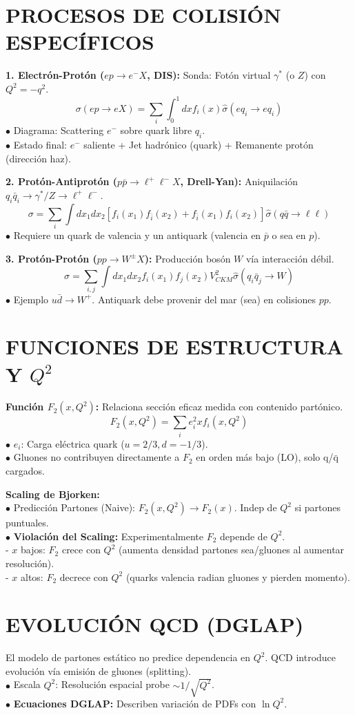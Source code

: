 \section{PROCESOS DE COLISIÓN ESPECÍFICOS}
\textbf{1. Electrón-Protón ($ep \to e^- X$, DIS):}
Sonda: Fotón virtual $\gamma^*$ (o $Z$) con $Q^2 = -q^2$.
$$ \sigma(ep \to eX) = \sum_i \int_0^1 dx f_i(x) \hat{\sigma}(eq_i \to eq_i) $$
$\bullet$ Diagrama: Scattering $e^-$ sobre quark libre $q_i$. \\
$\bullet$ Estado final: $e^-$ saliente + Jet hadrónico (quark) + Remanente protón (dirección haz).

\textbf{2. Protón-Antiprotón ($p\bar{p} \to \ell^+\ell^- X$, Drell-Yan):}
Aniquilación $q_i \bar{q}_i \to \gamma^*/Z \to \ell^+ \ell^-$.
$$ \sigma = \sum_{i} \int dx_1 dx_2 [f_i(x_1) f_{\bar{i}}(x_2) + f_{\bar{i}}(x_1) f_i(x_2)] \hat{\sigma}(q\bar{q} \to \ell\ell) $$
$\bullet$ Requiere un quark de valencia y un antiquark (valencia en $\bar{p}$ o sea en $p$).

\textbf{3. Protón-Protón ($pp \to W^\pm X$):}
Producción bosón $W$ vía interacción débil.
$$ \sigma = \sum_{i,j} \int dx_1 dx_2 f_i(x_1) f_j(x_2) V_{CKM}^2 \hat{\sigma}(q_i \bar{q}_j \to W) $$
$\bullet$ Ejemplo $u \bar{d} \to W^+$. Antiquark debe provenir del mar (sea) en colisiones $pp$.

\section{FUNCIONES DE ESTRUCTURA Y $Q^2$}
\textbf{Función $F_2(x, Q^2)$:}
Relaciona sección eficaz medida con contenido partónico.
$$ F_2(x, Q^2) = \sum_i e_i^2 x f_i(x, Q^2) $$
$\bullet$ $e_i$: Carga eléctrica quark ($u=2/3, d=-1/3$). \\
    $\bullet$ Gluones no contribuyen directamente a $F_2$ en orden más bajo (LO), solo q/$\bar{\text{q}}$ cargados.

\textbf{Scaling de Bjorken:}\\
$\bullet$ Predicción Partones (Naive): $F_2(x, Q^2) \to F_2(x)$. Indep de $Q^2$ si partones puntuales.\\
$\bullet$ \textbf{Violación del Scaling:} Experimentalmente $F_2$ depende de $Q^2$.\\
- $x$ bajos: $F_2$ crece con $Q^2$ (aumenta densidad partones sea/gluones al aumentar resolución).\\
- $x$ altos: $F_2$ decrece con $Q^2$ (quarks valencia radian gluones y pierden momento).

\section{EVOLUCIÓN QCD (DGLAP)}
El modelo de partones estático no predice dependencia en $Q^2$. QCD introduce evolución vía emisión de gluones (splitting).\\
$\bullet$ Escala $Q^2$: Resolución espacial probe $\sim 1/\sqrt{Q^2}$.\\
$\bullet$ \textbf{Ecuaciones DGLAP:} Describen variación de PDFs con $\ln Q^2$.\\

